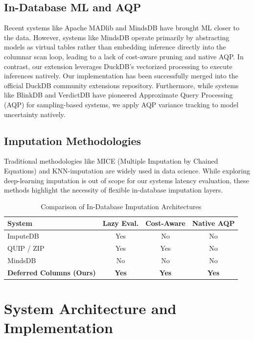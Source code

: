 \documentclass[conference]{IEEEtran}
\begin{document}
\subsection{In-Database ML and AQP}
Recent systems like Apache MADlib \cite{madlib} and MindsDB \cite{mindsdb} have brought ML closer to the data. However, systems like MindsDB operate primarily by abstracting models as virtual tables rather than embedding inference directly into the columnar scan loop, leading to a lack of cost-aware pruning and native AQP. In contrast, our extension leverages DuckDB's vectorized processing to execute inferences natively. Our implementation has been successfully merged into the official DuckDB community extensions repository. Furthermore, while systems like BlinkDB \cite{blinkdb} and VerdictDB \cite{verdictdb} have pioneered Approximate Query Processing (AQP) for sampling-based systems, we apply AQP variance tracking to model uncertainty natively.

\subsection{Imputation Methodologies}
Traditional methodologies like MICE (Multiple Imputation by Chained Equations) and KNN-imputation are widely used in data science. While exploring deep-learning imputation is out of scope for our systems latency evaluation, these methods highlight the necessity of flexible in-database imputation layers.

\begin{table}[htbp]
\centering
\caption{Comparison of In-Database Imputation Architectures}
\begin{tabular}{@{}lccc@{}}
\toprule
\textbf{System} & \textbf{Lazy Eval.} & \textbf{Cost-Aware} & \textbf{Native AQP} \\
\midrule
ImputeDB \cite{imputedb} & Yes & No & No \\
QUIP \cite{quip} / ZIP \cite{zip} & Yes & Yes & No \\
MindsDB \cite{mindsdb} & No & No & No \\
\textbf{Deferred Columns (Ours)} & \textbf{Yes} & \textbf{Yes} & \textbf{Yes} \\
\bottomrule
\end{tabular}
\label{tab:comparison}
\end{table}

\section{System Architecture and Implementation}
\end{document}
